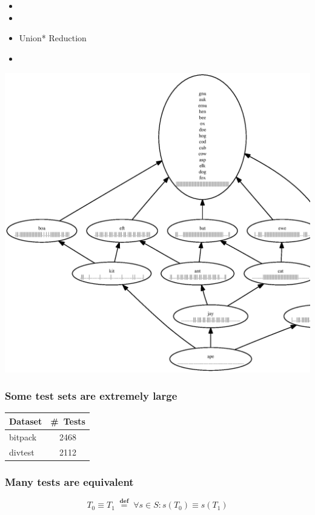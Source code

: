 \documentclass[svgnames,14pt]{beamer}
\newcommand\defined{\mathrel{\;\stackrel{\scriptscriptstyle\mathbf{def}}{=}\;}}
\theoremstyle{definition}
\begin{document}

\begin{frame}
\begin{itemize}
\frametitle{Overview}
\item {}
\item {}
\item Union* Reduction
\item {}
\end{itemize}
\end{frame}

\begin{frame}
\centerline{\includegraphics[height=0.9\textheight]{fail.ps}}
\end{frame}

\begin{frame}
\frametitle{Some test sets are extremely large}
\begin{tabular}{ | l | c | }
\hline
Dataset & \#~Tests \\ 
\hline
bitpack & 2468 \\
divtest & 2112 \\
\hline
\end{tabular}
\end{frame}

\begin{frame}
\frametitle{Many tests are equivalent}
\begin{block}{}
$$ T_0 \equiv T_1 \defined \forall s \in S : s(T_0) \equiv s(T_1) $$
\end{block}
\end{frame}
\end{document}
